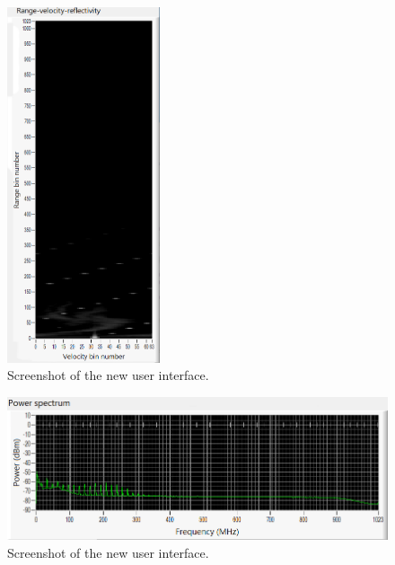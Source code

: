 \documentclass{article}
\begin{document}
\begin{figure}
	\centering
	\includegraphics[width=0.4\textwidth]{working-hail_range-doppler}
	\caption{Screenshot of the new user interface.}
	\label{fig:WorkingHailRangeDoppler}
\end{figure}

\begin{figure}
	\centering
	\includegraphics[width=\textwidth]{working-hail_power-spect}
	\caption{Screenshot of the new user interface.}
	\label{fig:WorkingHailPowerSpectrum}
\end{figure}
\end{document}
